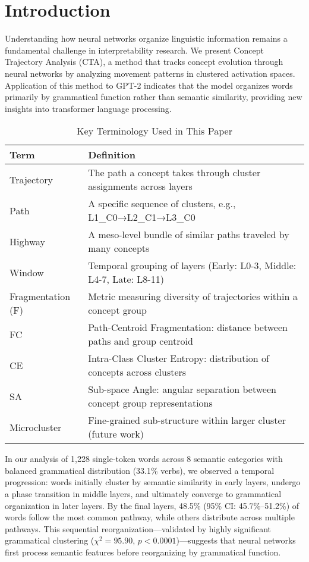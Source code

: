 \section{Introduction}

Understanding how neural networks organize linguistic information remains a fundamental challenge in interpretability research. We present Concept Trajectory Analysis (CTA), a method that tracks concept evolution through neural networks by analyzing movement patterns in clustered activation spaces. Application of this method to GPT-2 indicates that the model organizes words primarily by grammatical function rather than semantic similarity, providing new insights into transformer language processing.

\begin{table}[h!]
\centering
\caption{Key Terminology Used in This Paper}
\label{tab:glossary}
\begin{tabular}{ll}
\toprule
\textbf{Term} & \textbf{Definition} \\
\midrule
Trajectory & The path a concept takes through cluster assignments across layers \\
Path & A specific sequence of clusters, e.g., L1\_C0→L2\_C1→L3\_C0 \\
Highway & A meso-level bundle of similar paths traveled by many concepts \\
Window & Temporal grouping of layers (Early: L0-3, Middle: L4-7, Late: L8-11) \\
Fragmentation (F) & Metric measuring diversity of trajectories within a concept group \\
FC & Path-Centroid Fragmentation: distance between paths and group centroid \\
CE & Intra-Class Cluster Entropy: distribution of concepts across clusters \\
SA & Sub-space Angle: angular separation between concept group representations \\
Microcluster & Fine-grained sub-structure within larger cluster (future work) \\
\bottomrule
\end{tabular}
\end{table}

In our analysis of 1,228 single-token words across 8 semantic categories with balanced grammatical distribution (33.1\% verbs), we observed a temporal progression: words initially cluster by semantic similarity in early layers, undergo a phase transition in middle layers, and ultimately converge to grammatical organization in later layers. By the final layers, 48.5\% (95\% CI: 45.7\%–51.2\%) of words follow the most common pathway, while others distribute across multiple pathways. This sequential reorganization—validated by highly significant grammatical clustering ($\chi^2 = 95.90$, $p < 0.0001$)—suggests that neural networks first process semantic features before reorganizing by grammatical function.

